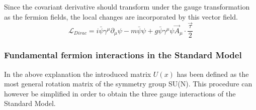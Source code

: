 Since the covariant derivative should transform under the gauge transformation as the fermion fields, the local changes are incorporated by this vector field.
\begin{equation} \label{eq::DiracLInter}
 \mathcal{L}_{Dirac} = i \bar{\psi} \gamma^{\mu} \partial_{\mu} \psi - m \bar{\psi} \psi + g \bar{\psi} \gamma^{\mu} \psi \vec{A}_{\mu} \cdot \frac{\vec{\tau}}{2}
\end{equation}

\subsubsection{Fundamental fermion interactions in the Standard Model}
In the above explanation the introduced matrix $U(x)$ has been defined as the most general rotation matrix of the symmetry group SU(N).
This procedure can however be simplified in order to obtain the three gauge interactions of the Standard Model. %

